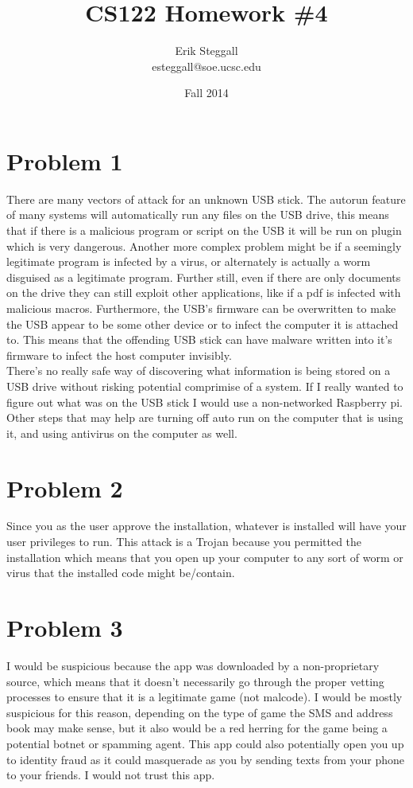 \documentclass{article}
\title{CS122 Homework \#4}
\author{Erik Steggall \\ esteggall@soe.ucsc.edu}
\date{Fall 2014}
\begin{document}
 \maketitle \pagestyle{empty}
\section*{Problem 1}
There are many vectors of attack for an unknown USB stick. The autorun feature of many systems will automatically run any files on the USB drive, this means that if there is a malicious program or script on the USB it will be run on plugin which is very dangerous. Another more complex problem might be if a seemingly legitimate program is infected by a virus, or alternately is actually a worm disguised as a legitimate program. Further still, even if there are only documents on the drive they can still exploit other applications, like if a pdf is infected with malicious macros. Furthermore, the USB's firmware can be overwritten to make the USB appear to be some other device or to infect the computer it is attached to. This means that the offending USB stick can have malware written into it's firmware to infect the host computer invisibly.\\
There's no really safe way of discovering what information is being stored on a USB drive without risking potential comprimise of a system. If I really wanted to figure out what was on the USB stick I would use a non-networked Raspberry pi. Other steps that may help are turning off auto run on the computer that is using it, and using antivirus on the computer as well.\\

\section*{Problem 2}
Since you as the user approve the installation, whatever is installed will have your user privileges to run. This attack is a Trojan because you permitted the installation which means that you open up your computer to any sort of worm or virus that the installed code might be/contain.\\

\section*{Problem 3}
I would be suspicious because the app was downloaded by a non-proprietary source, which means that it doesn't necessarily go through the proper vetting processes to ensure that it is a legitimate game (not malcode). I would be mostly suspicious for this reason, depending on the type of game the SMS and address book may make sense, but it also would be a red herring for the game being a potential botnet or spamming agent. This app could also potentially open you up to identity fraud as it could masquerade as you by sending texts from your phone to your friends. I would not trust this app.\\ 
\end{document}
